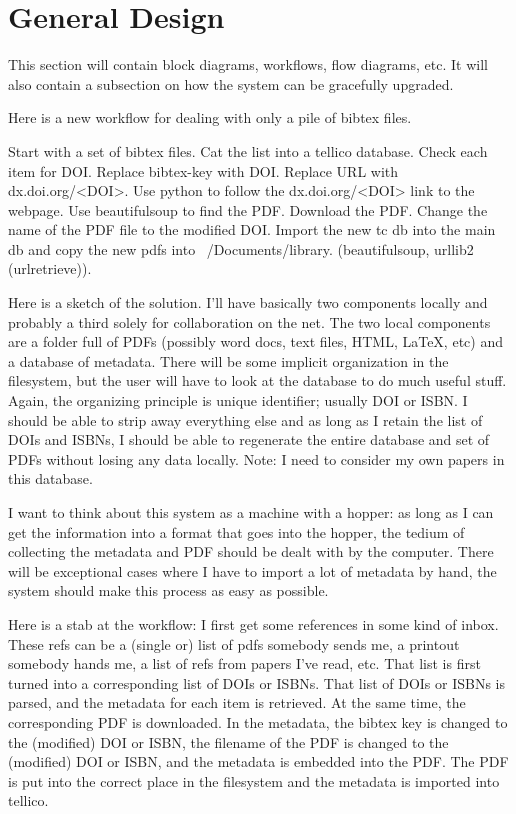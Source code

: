 \documentclass[letterpaper,12pt]{article}
\begin{document}
\section{General Design}
This section will contain block diagrams, workflows, flow diagrams, etc. It will also contain a subsection on how the system can be gracefully upgraded.

Here is a new workflow for dealing with only a pile of bibtex files. 

Start with a set of bibtex files. Cat the list into a tellico database. Check each item for DOI. Replace bibtex-key with DOI. Replace URL with dx.doi.org/<DOI>. Use python to follow the dx.doi.org/<DOI> link to the webpage. Use beautifulsoup to find the PDF. Download the PDF. Change the name of the PDF file to the modified DOI. Import the new tc db into the main db and copy the new pdfs into ~/Documents/library. (beautifulsoup, urllib2 (urlretrieve)).

Here is a sketch of the solution.
I'll have basically two components locally and probably a third solely for collaboration on the net. The two local components are a folder full of PDFs (possibly word docs, text files, HTML, \LaTeX, etc) and a database of metadata. There will be some implicit organization in the filesystem, but the user will have to look at the database to do much useful stuff. Again, the organizing principle is unique identifier; usually DOI or ISBN. I should be able to strip away everything else and as long as I retain the list of DOIs and ISBNs, I should be able to regenerate the entire database and set of PDFs without losing any data locally. Note: I need to consider my own papers in this database.

I want to think about this system as a machine with a hopper: as long as I can get the information into a format that goes into the hopper, the tedium of collecting the metadata and PDF should be dealt with by the computer. There will be exceptional cases where I have to import a lot of metadata by hand, the system should make this process as easy as possible.

Here is a stab at the workflow: I first get some references in some kind of inbox. These refs can be a (single or) list of pdfs somebody sends me, a printout somebody hands me, a list of refs from papers I've read, etc. That list is first turned into a corresponding list of DOIs or ISBNs. That list of DOIs or ISBNs is parsed, and the metadata for each item is retrieved. At the same time, the corresponding PDF is downloaded. In the metadata, the bibtex key is changed to the (modified) DOI or ISBN, the filename of the PDF is changed to the (modified) DOI or ISBN, and the metadata is embedded into the PDF. The PDF is put into the correct place in the filesystem and the metadata is imported into tellico.
\end{document}
